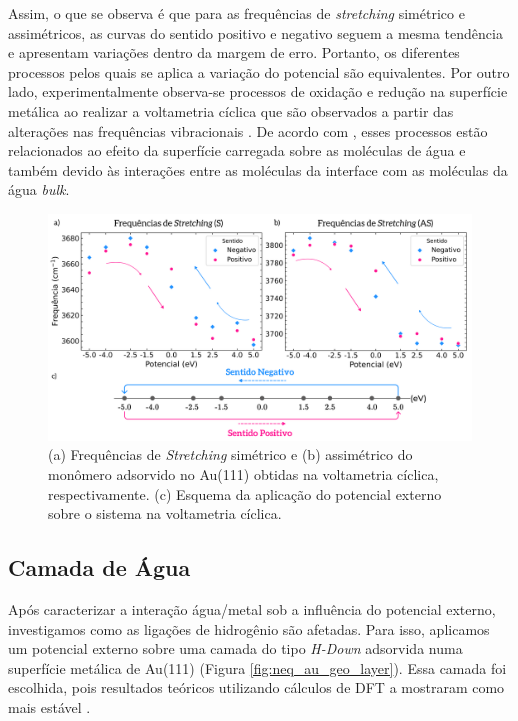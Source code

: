 
Assim, o que se observa é que para as frequências de \textit{stretching} simétrico e assimétricos, as curvas do sentido positivo e negativo seguem a mesma tendência e apresentam variações dentro da margem de erro. Portanto, os diferentes processos pelos quais se aplica a variação do potencial são equivalentes. Por outro lado, experimentalmente observa-se processos de oxidação e redução na superfície metálica ao realizar a voltametria cíclica que são observados a partir das alterações nas frequências vibracionais \cite{sfg_kramer}. De acordo com \citeauthor{sfg_kramer}, esses processos estão relacionados ao efeito da superfície carregada sobre as moléculas de água e também devido às interações entre as moléculas da interface com as moléculas da água \textit{bulk}. 

\begin{figure}[h!]
	\centering
	\caption{(a) Frequências de \textit{Stretching} simétrico e (b) assimétrico do monômero adsorvido no Au(111) obtidas na voltametria cíclica, respectivamente. (c) Esquema da aplicação do potencial externo sobre o sistema na voltametria cíclica.}
	\label{fig:neq_au_voltametria}
	\includegraphics[scale=0.06]{figs/voltametria_monomer.png}
\end{figure}

\subsection{Camada de Água \label{sec:neq_au_layer}}

Após caracterizar a interação água/metal sob a influência do potencial externo, investigamos como as ligações de hidrogênio são afetadas. Para isso, aplicamos um potencial externo sobre uma camada do tipo \textit{H-Down} adsorvida numa superfície metálica de Au(111) (Figura \ref{fig:neq_au_geo_layer}). Essa camada foi escolhida, pois resultados teóricos utilizando cálculos de DFT a mostraram como mais estável \cite{monomer}. 

